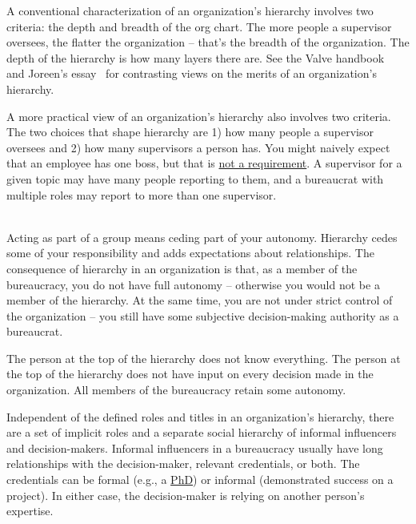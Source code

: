A conventional characterization of an organization's hierarchy involves two criteria: the depth and breadth of the \gls{org chart}.
The more people a supervisor oversees, the flatter the organization -- that's the breadth of the organization. The depth of the hierarchy is how many layers there are. See the Valve handbook~\cite{2012_Valve} and Joreen's essay~\cite{1972_Joreen} for contrasting views on the merits of an organization's hierarchy. 

A more practical view of an organization's hierarchy also involves two criteria. The two choices that shape hierarchy are 
1) how many people a supervisor oversees and 
2) how many supervisors a person has. 
You might naively expect that an employee has one boss, but that is \href{https://en.wikipedia.org/wiki/Matrix_management}{not a requirement}. 
A supervisor for a given topic may have many people reporting to them, and a bureaucrat with multiple roles may report to more than one supervisor.

\ \\

Acting as part of a group means ceding part of your autonomy. Hierarchy cedes some of your responsibility and adds expectations about relationships.
The consequence of hierarchy in an organization is that, as a member of the bureaucracy, you do not have full autonomy -- otherwise you would not be a member of the hierarchy. At the same time, you are not under strict control of the organization -- you still have some subjective decision-making authority as a bureaucrat.

The person at the top of the hierarchy does not know everything. The person at the top of the hierarchy does not have input on every decision made in the organization. All members of the bureaucracy retain some autonomy.

Independent of the defined roles and titles in an organization's hierarchy, there are a set of implicit roles and a separate social hierarchy of informal influencers and decision-makers. Informal influencers in a bureaucracy usually have long relationships with the decision-maker, relevant credentials, or both. The credentials can be formal (e.g., a \href{https://en.wikipedia.org/wiki/Doctor_of_Philosophy}{PhD}) 
or informal (demonstrated success on a project). In either case, the decision-maker is relying on another person's expertise. 

